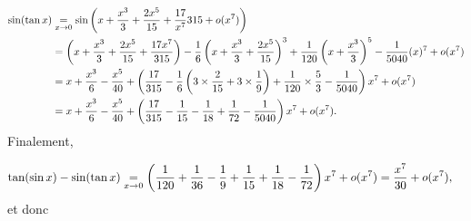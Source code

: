 {\begin{enumerate}
{\begin{align*}\ensuremath
\sin(\tan x)&\underset{x\rightarrow0}{=}\sin\left(x+\frac{x^3}{3}+\frac{2x^5}{15}+\frac{17}{x^7}{315}+o(x^7)\right)\\
 &=\left(x+\frac{x^3}{3}+\frac{2x^5}{15}+\frac{17x^7}{315}\right)-\frac{1}{6}\left(x+\frac{x^3}{3}+\frac{2x^5}{15}\right)^3+\frac{1}{120}\left(x+\frac{x^3}{3}\right)^5-\frac{1}{5040}(x)^7+o(x^7)\\
 &= x+\frac{x^3}{6}-\frac{x^5}{40}+\left(\frac{17}{315}
 -\frac{1}{6}\left(3\times\frac{2}{15}+3\times\frac{1}{9}\right)+\frac{1}{120}\times\frac{5}{3}-\frac{1}{5040}\right)x^7+o(x^7)\\
 &=x+\frac{x^3}{6}-\frac{x^5}{40}+\left(\frac{17}{315}-\frac{1}{15}-\frac{1}{18}+\frac{1}{72}-\frac{1}{5040}\right)x^7+o(x^7).
\end{align*}
Finalement,

\begin{align*}\ensuremath
\tan(\sin x)-\sin(\tan x)&\underset{x\rightarrow0}{=}\left(\frac{1}{120}+\frac{1}{36}
-\frac{1}{9}+\frac{1}{15}+\frac{1}{18}-\frac{1}{72}\right)x^7+o(x^7)
=\frac{x^7}{30}+o(x^7),
\end{align*}
et donc

\begin{center}
\end{center}}
\end{enumerate}
}
